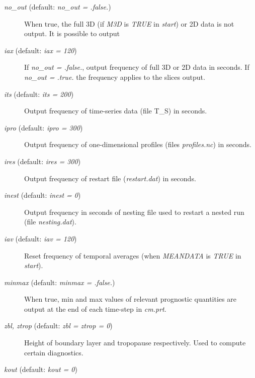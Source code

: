 \documentclass[12pt,A4,french]{article}
\begin{document}
\begin{description}

\item[{\it no\_out} (default: {\it no\_out = .false.})]

When true, the full 3D (if {\it M3D} is {\it TRUE} in {\it start}) or 2D data is not output. It is possible to output 

\item[{\it iax} (default: {\it iax = 120})]

If {\it no\_out = .false.}, output frequency of full 3D or 2D data in seconds. If {\it no\_out = .true.} the frequency applies to the slices output.

\item[{\it its} (default: {\it its = 200})]

Output frequency of time-series data (file T\_S) in seconds.

\item[{\it ipro} (default: {\it ipro = 300})]

Output frequency of one-dimensional profiles (files {\it profiles.nc}) in seconds.

\item[{\it ires} (default: {\it ires = 300})]

Output frequency of restart file ({\it restart.dat}) in seconds.

\item[{\it inest} (default: {\it inest = 0})]

Output frequency in seconds of nesting file used to restart a nested run (file {\it nesting.dat}).

\item[{\it iav} (default: {\it iav = 120})]

Reset frequency of temporal averages (when {\it MEANDATA} is {\it TRUE} in {\it start}).

\item[{\it minmax} (default: {\it minmax = .false.})]

When true, min and max values of relevant prognostic quantities are output at the end of each time-step in {\it cm.prt}.

\item[{\it zbl, ztrop} (default: {\it zbl = ztrop = 0})]

Height of boundary layer and tropopause respectively. Used to compute certain diagnostics.

\item[{\it kout} (default: {\it kout = 0})]


\end{description}
\end{document}
